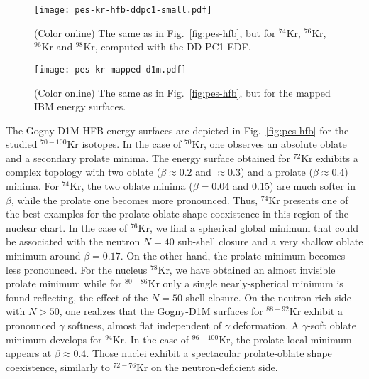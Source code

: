 \documentclass[twocolumn,showpacs,amsmath,amssymb,superscriptaddress]{revtex4-1}
\begin{document}

\begin{figure}[htb!]
\begin{center}
\texttt{[image: pes-kr-hfb-ddpc1-small.pdf]}
\caption{(Color online) The same as in Fig.~\ref{fig:pes-hfb}, but for 
 $^{74}$Kr, $^{76}$Kr, $^{96}$Kr and $^{98}$Kr, computed with the DD-PC1 EDF.}
\label{fig:pes-hfb-ddpc1}
\end{center}
\end{figure}





\begin{figure*}[htb!]
\begin{center}
\texttt{[image: pes-kr-mapped-d1m.pdf]}
\caption{(Color online) The same as in Fig.~\ref{fig:pes-hfb}, 
but for the mapped IBM energy surfaces.}
\label{fig:pes-mapped}
\end{center}
\end{figure*}


The Gogny-D1M HFB energy surfaces
are depicted  in Fig.~\ref{fig:pes-hfb}
for the studied $^{70-100}$Kr isotopes. In the case 
of $^{70}$Kr, one observes an absolute oblate and 
a secondary prolate minima. The energy surface 
obtained for $^{72}$Kr exhibits a complex topology
with two oblate ($\beta\approx 0.2$ and $\approx 0.3$)
and a prolate ($\beta\approx 0.4$) minima.
For $^{74}$Kr, the two oblate minima ($\beta=0.04$ and 0.15) are much
softer in $\beta$, while the prolate one becomes more pronounced. 
Thus, $^{74}$Kr presents one of the best examples for the
prolate-oblate shape coexistence in this region of the nuclear chart. 
In the case of $^{76}$Kr, we find a spherical global minimum 
that could be associated with the 
neutron $N=40$ sub-shell closure
and a very 
shallow
oblate minimum around $\beta=0.17$. On the other hand, the
prolate minimum  becomes less pronounced. For the nucleus 
$^{78}$Kr, we have obtained an almost 
invisible prolate minimum while for $^{80-86}$Kr only 
a single nearly-spherical
minimum is found reflecting, the effect of the 
$N=50$  shell closure. On the neutron-rich side with $N>50$, one  realizes that the
Gogny-D1M surfaces for $^{88-92}$Kr exhibit a 
pronounced $\gamma$ softness, almost flat independent of $\gamma$
deformation. A $\gamma$-soft oblate minimum 
develops for $^{94}$Kr. In the case of $^{96-100}$Kr, the prolate 
local minimum appears at 
$\beta\approx 0.4$. Those  nuclei exhibit a spectacular prolate-oblate shape
coexistence, similarly to  $^{72-76}$Kr on the neutron-deficient side. 
\end{document}
